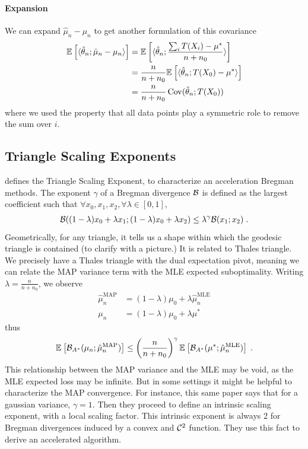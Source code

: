 \documentclass{article}
\newcommand*{\expect}[2][]{\ensuremath{\mathbb{E}_{#1} \left[ #2 \right] }} %
\newcommand{\logpart}{A}
\newcommand{\bregmanconj}{\cB_{\logpart^*}}
\newcommand{\natp}{\theta}
\newcommand{\MAPm}{\hat \mu_n}
\begin{document}
\paragraph{Expansion}
We can expand  $\hat \mu_n - \mu_n$ to get another formulation of this covariance
\begin{align}
	\expect{\langle \hat \natp_n ; \hat \mu_n - \mu_n \rangle}
	&= \expect{\langle \hat \natp_n ; \frac{\sum_i T(X_i) - \mu^*}{n+n_0} \rangle}  \\
	& = \frac{n}{n+n_0} \expect{\langle \hat \natp_n ; T(X_0) - \mu^*\rangle} \\
	&= \frac{n}{n+n_0} \Cov(\hat \natp_n ; T(X_0) ) 
	\label{eq:covariance_expansion}
\end{align}
where we used the property that all data points play a symmetric role to remove the sum over $i$.

\subsection{Triangle Scaling Exponents}

\citet{hanzely2021accelerated} 
defines the Triangle Scaling Exponent, to characterize an acceleration Bregman methods. The exponent $\gamma$ of a Bregman divergence ${\mathcal B}$ is defined as the largest coefficient such that $
	\forall x_0, x_1, x_2, \forall \lambda\in[0,1],$
\begin{align}
	{\mathcal B}((1-\lambda)x_0 + \lambda x_1 ; (1-\lambda)x_0 + \lambda x_2)
	\leq \lambda^\gamma {\mathcal B}(x_1 ; x_2) \; .
\end{align}
Geometrically, for any triangle, it tells us a shape within which the geodesic triangle is contained (to clarify with a picture.)
It is related to Thales triangle.
We precisely have a Thales triangle with the dual expectation pivot, meaning we can relate the MAP variance term with the MLE expected suboptimality. Writing $\lambda = \frac{n}{n+n_0}$, we observe
\begin{align}
	\MAPm^\text{MAP} &= (1-\lambda)\mu_0 + \lambda \MAPm^\text{MLE} \\
	\mu_n &= (1-\lambda)\mu_0 + \lambda \mu^*
\end{align}
thus
\begin{align}
	\expect{\bregmanconj(\mu_n; \MAPm^\text{MAP})}
	\leq \left (\frac{n}{n+n_0} \right)^\gamma \expect{\bregmanconj(\mu^*; \MAPm^\text{MLE})} \; .
\end{align}
This relationship between the MAP variance and the MLE may be void, as the MLE expected loss may be infinite. But in some settings it might be helpful to characterize the MAP convergence.
For instance, this same paper says that for a gaussian variance, $\gamma=1$. Then they proceed to define an intrinsic scaling exponent, with a local scaling factor. This intrinsic exponent is always 2 for Bregman divergences induced by a convex and ${\mathcal C}^2$ function. They use this fact to derive an accelerated algorithm.
\end{document}
